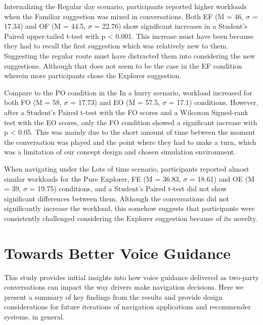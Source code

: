 Internalizing the Regular day scenario, participants reported higher workloads when the Familiar suggestion was mixed in conversations. Both EF (M = 46, $\sigma$ = 17.34) and OF (M = 44.5, $\sigma$ = 22.76) show significant increases in a Student's Paired upper-tailed t-test with p < 0.001. This increase must have been because they had to recall the first suggestion which was relatively new to them. Suggesting the regular route must have distracted them into considering the new suggestions. Although that does not seem to be the case in the EF condition wherein more participants chose the Explorer suggestion.

Compare to the PO condition in the In a hurry scenario, workload increased for both FO (M = 58, $\sigma$ = 17.73) and EO (M = 57.5, $\sigma$ = 17.1) conditions. However, after a Student's Paired t-test with the FO scores and a Wilcoxon Signed-rank test with the EO scores, only the FO condition showed a significant increase with p < 0.05. This was mainly due to the short amount of time between the moment the conversation was played and the point where they had to make a turn, which was a limitation of our concept design and chosen simulation environment.

When navigating under the Lots of time scenario, participants reported almost similar workloads for the Pure Explorer, FE (M = 36.83, $\sigma$ = 18.61) and OE (M = 39, $\sigma$ = 19.75) conditions, and a Student's Paired t-test did not show significant differences between them. Although the conversations did not significantly increase the workload, this somehow suggests that participants were consistently challenged considering the Explorer suggestion because of its novelty.

\section{Towards Better Voice Guidance}

This study provides initial insights into how voice guidance delivered as two-party conversations can impact the way drivers make navigation decisions. Here we present a summary of key findings from the results and provide design considerations for future iterations of navigation applications and recommender systems, in general.

